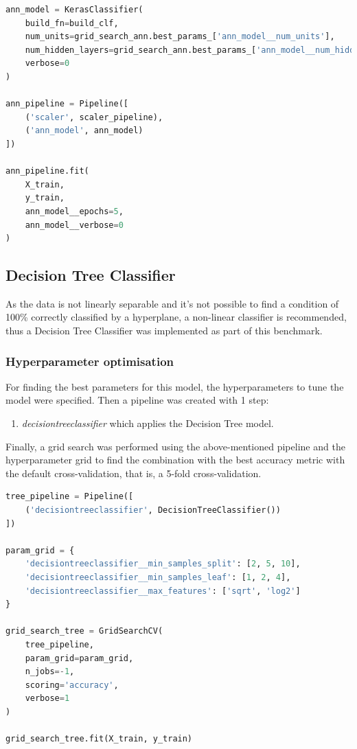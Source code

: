 \documentclass{article}
\begin{document}
\begin{lstlisting}[language=Python]
ann_model = KerasClassifier(
    build_fn=build_clf,
    num_units=grid_search_ann.best_params_['ann_model__num_units'],
    num_hidden_layers=grid_search_ann.best_params_['ann_model__num_hidden_layers'],
    verbose=0
)

ann_pipeline = Pipeline([
    ('scaler', scaler_pipeline), 
    ('ann_model', ann_model)
])

ann_pipeline.fit(
    X_train, 
    y_train,     
    ann_model__epochs=5, 
    ann_model__verbose=0
)
\end{lstlisting}





\subsection{Decision Tree Classifier}
As the data is not linearly separable and it's not possible to find a condition of 100\% correctly classified by a hyperplane, a non-linear classifier is recommended, thus a Decision Tree Classifier was implemented as part of this benchmark.

\subsubsection{Hyperparameter optimisation}
For finding the best parameters for this model, the hyperparameters to tune the model were specified. Then a pipeline was created with 1 step:
\begin{enumerate}
\item \emph{decisiontreeclassifier} which applies the Decision Tree model.
\end{enumerate}

Finally, a grid search was performed using the above-mentioned pipeline and the hyperparameter grid to find the combination with the best accuracy metric with the default cross-validation, that is, a 5-fold cross-validation.
\begin{lstlisting}[language=Python]
tree_pipeline = Pipeline([
    ('decisiontreeclassifier', DecisionTreeClassifier())
])

param_grid = {
    'decisiontreeclassifier__min_samples_split': [2, 5, 10],
    'decisiontreeclassifier__min_samples_leaf': [1, 2, 4],
    'decisiontreeclassifier__max_features': ['sqrt', 'log2']
}

grid_search_tree = GridSearchCV(
    tree_pipeline,
    param_grid=param_grid,
    n_jobs=-1,
    scoring='accuracy',
    verbose=1
)

grid_search_tree.fit(X_train, y_train)
\end{lstlisting}
\end{document}

